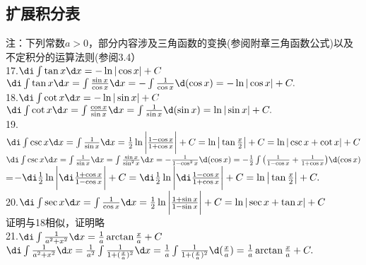 \subsection{扩展积分表}
\vspace{1em}
\noindent 注：下列常数$a>0$，部分内容涉及三角函数的变换(参阅附章三角函数公式)以及不定积分的运算法则(参阅3.4）\vspace{-0.5em}\\
17.\enspace $\di\int \tan x\d x=-\ln |\cos x|+C$
\vspace{1em}\\ \proof $\di\int \tan x\d x=\int \frac{\sin x}{\cos x}\d x=-\int\frac{1}{\cos x}\d (\cos x)=-\ln|\cos x|+C.$\\
18.\enspace $\di\int \cot x\d x=-\ln |\sin x|+C$
\vspace{1em}\\ \proof $\di\int \cot x\d x=\int \frac{\cos x}{\sin x}\d x=\int\frac{1}{\sin x}\d (\sin x)=\ln|\sin x|+C.$\vspace{0.5em}\\
19.\enspace $\di\int \csc x\d x=\int\frac{1}{\sin x}\d x=\frac{1}{2}\ln \bigg|\frac{1-\cos x}{1+\cos x}\bigg|+C=\ln\big |\tan \frac{x}{2}\big|+C=\ln|\csc x+\cot x|+C
$
\vspace{1em}\\ \proof $\di\int \csc x\d x=\int \frac{1}{\sin x}\d x=\int\frac{\sin x}{\sin^2 x}\d x=-\frac{1}{1-\cos^2 x}\d (\cos x)=-\frac{1}{2}\int \big(\frac{1}{1-\cos x}+\frac{1}{1+\cos x}\big)\d(\cos x)$\vspace{0.5em}\\
=$-\di\frac{1}{2}\ln \bigg|\di\frac{1+\cos x}{1-\cos x}\bigg|+C=\di\frac{1}{2}\ln \bigg|\di\frac{1-\cos x}{1+\cos x}\bigg|+C=\ln\big |\tan \frac{x}{2}\big|+C. $
\vspace{1em}\\20.\enspace $\di\int \sec x\d x=\int\frac{1}{\cos x}\d x=\frac{1}{2}\ln \bigg|\frac{1+\sin x}{1-\sin x}\bigg|+C=\ln|\sec x+\tan x|+C
$
\vspace{1em}\\
\proof 证明与18相似，证明略\vspace{0.5em}\\
21.\enspace $\di\int\frac{1}{a^2+x^2}\d x=\frac{1}{a}\arctan\frac{x}{a}+C$\vspace{1.5em}\\
\proof $\di\int\frac{1}{a^2+x^2}\d x=\frac{1}{a^2}\int\frac{1}{1+(\frac{x}{a})^2}\d x=\frac{1}{a}\int\frac{1}{1+(\frac{x}{a})^2}\d(\frac{x}{a})=\frac{1}{a}\arctan\frac{x}{a}+C.$
\vspace{0.5em}\\ 
